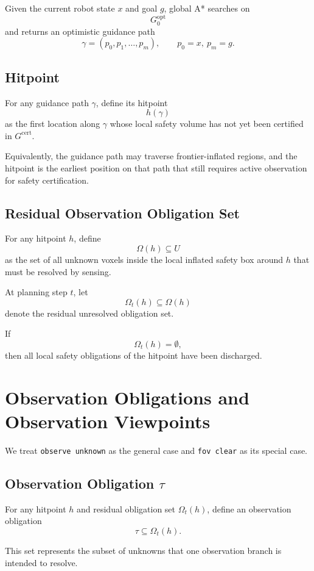 \documentclass[11pt]{article}
\begin{document}
Given the current robot state $x$ and goal $g$, global A* searches on
\[
G^{\mathrm{opt}}_0
\]
and returns an optimistic guidance path
\[
\gamma=(p_0,p_1,\dots,p_m), \qquad p_0=x,\ p_m=g.
\]

\subsection{Hitpoint}

For any guidance path $\gamma$, define its hitpoint
\[
h(\gamma)
\]
as the first location along $\gamma$ whose local safety volume has not yet been certified in $G^{\mathrm{cert}}$.

Equivalently, the guidance path may traverse frontier-inflated regions, and the hitpoint is the earliest position on that path that still requires active observation for safety certification.

\subsection{Residual Observation Obligation Set}

For any hitpoint $h$, define
\[
\Omega(h)\subseteq U
\]
as the set of all unknown voxels inside the local inflated safety box around $h$ that must be resolved by sensing.

At planning step $t$, let
\[
\Omega_t(h)\subseteq \Omega(h)
\]
denote the residual unresolved obligation set.

If
\[
\Omega_t(h)=\emptyset,
\]
then all local safety obligations of the hitpoint have been discharged.

\section{Observation Obligations and Observation Viewpoints}

We treat \texttt{observe unknown} as the general case and \texttt{fov clear} as its special case.

\subsection{Observation Obligation \texorpdfstring{$\tau$}{tau}}

For any hitpoint $h$ and residual obligation set $\Omega_t(h)$, define an observation obligation
\[
\tau \subseteq \Omega_t(h).
\]

This set represents the subset of unknowns that one observation branch is intended to resolve.
\end{document}
